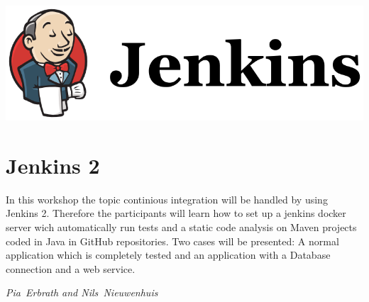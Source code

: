 \includegraphics[width=\linewidth]{images/jenkins-logo.png}

\section*{Jenkins 2}
In this workshop the topic continious integration will be handled by
using Jenkins 2. Therefore the participants will learn how to set up a
jenkins docker server wich automatically run tests and a static code
analysis on Maven projects coded in Java in GitHub repositories. Two
cases will be presented: A normal application which is completely
tested and an application with a Database connection and a web
service.

\hfill\textit{Pia~Erbrath and Nils~Nieuwenhuis}
